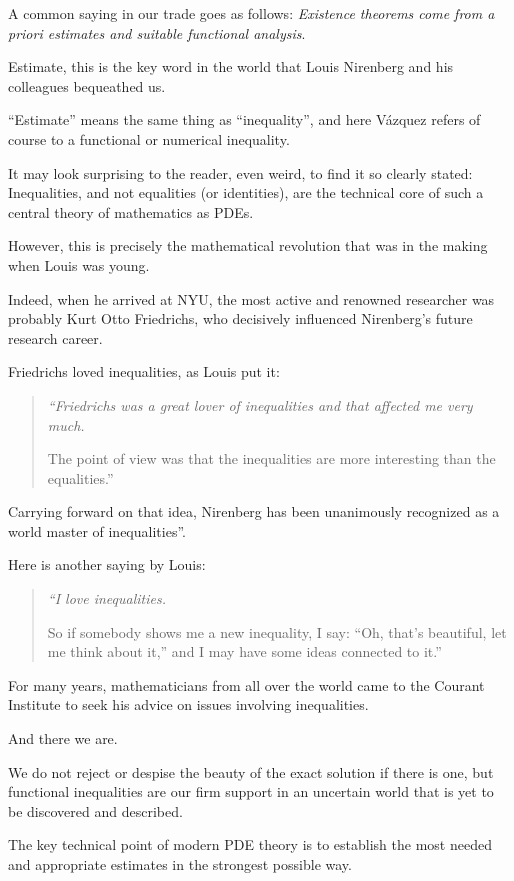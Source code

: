 \documentclass{article}
\begin{document}
A common saying in our trade goes as follows: \textit{Existence theorems come from a priori estimates and suitable functional analysis}.

Estimate, this is the key word in the world that Louis Nirenberg and his colleagues bequeathed us.

``Estimate'' means the same thing as ``inequality'', and here V\'azquez refers of course to a functional or numerical inequality.

%
It may look surprising to the reader, even weird, to find it so clearly stated: Inequalities, and not equalities (or identities), are the technical core of such a central theory of mathematics as PDEs.

However, this is precisely the mathematical revolution that was in the making when Louis was young.

Indeed, when he arrived at NYU, the most active and renowned researcher was probably Kurt Otto Friedrichs, who decisively influenced Nirenberg's future research career.

Friedrichs loved inequalities, as Louis put it:
\begin{quotation}\it
	``Friedrichs was a great lover of inequalities and that affected me very much.
	
	The point of view was that the inequalities are more interesting than the equalities.''
\end{quotation}
Carrying forward on that idea, Nirenberg has been unanimously recognized as a world master of inequalities''.

Here is another saying by Louis:
\begin{quotation}\it
	``I love inequalities.
	
	So if somebody shows me a new inequality, I say: ``Oh, that's beautiful, let me think about it,'' and I may have some ideas connected to it.''
\end{quotation}
For many years, mathematicians from all over the world came to the Courant Institute to seek his advice on issues involving inequalities.

%
And there we are.

We do not reject or despise the beauty of the exact solution if there is one, but functional inequalities are our firm support in an uncertain world that is yet to be discovered and described.

The key technical point of modern PDE theory is to establish the most needed and appropriate estimates in the strongest possible way.
\end{document}
